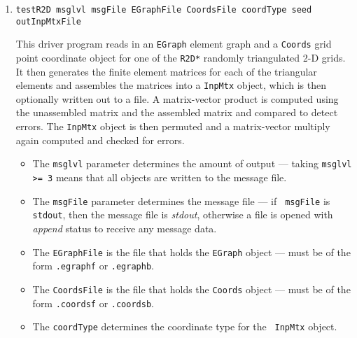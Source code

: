 \begin{enumerate}
\begin{itemize}
{\tt Graph} object. 
If {\tt outGraphFile} is {\tt none} then the {\tt Graph} object is not
written to a file. 
Otherwise, the {\tt Graph\_writeToFile()} method is called to write
the object to 
a formatted file (if {\tt outGraphFile} is of the form 
{\tt *.graphf}),
or
a binary file (if {\tt outGraphFile} is of the form {\tt *.graphb}).
\item
The {\tt flag} parameter is used to specify whether the offsets
and indices are 0-indexed (as in C) or 1-indexed (as in Fortran).
If they are 1-indexed, the offsets and indices are decremented
prior to loading into the {\tt InpMtx} object.
\end{itemize}
\item
\begin{verbatim}
testR2D msglvl msgFile EGraphFile CoordsFile coordType seed outInpMtxFile
\end{verbatim}
This driver program reads in an {\tt EGraph} element graph and a
{\tt Coords} grid point coordinate object for one of the {\tt R2D*}
randomly triangulated 2-D grids.
It then generates the finite element matrices for each of the
triangular elements and assembles the matrices into a {\tt InpMtx}
object, which is then optionally written out to a file.
A matrix-vector product is computed using the unassembled matrix
and the assembled matrix and compared to detect errors. 
The {\tt InpMtx} object is then permuted and a matrix-vector
multiply again computed and checked for errors.
\begin{itemize}
\item
The {\tt msglvl} parameter determines the amount of output ---
taking {\tt msglvl >= 3} means that all objects are written
to the message file.
\item
The {\tt msgFile} parameter determines the message file --- if {\tt
msgFile} is {\tt stdout}, then the message file is {\it stdout},
otherwise a file is opened with {\it append} status to receive any
message data.
\item
The {\tt EGraphFile} is the file that holds the {\tt EGraph}
object --- must be of the form {\tt *.egraphf} or {\tt *.egraphb}.
\item
The {\tt CoordsFile} is the file that holds the {\tt Coords}
object --- must be of the form {\tt *.coordsf} or {\tt *.coordsb}.
\item
The {\tt coordType} determines the coordinate type for the {\tt
InpMtx} object.
\begin{itemize}

\end{itemize}
\end{itemize}
\end{enumerate}

